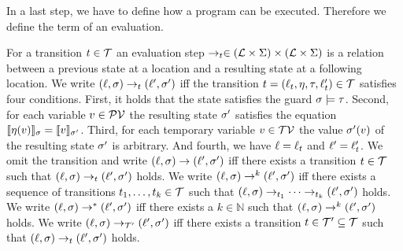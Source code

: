 In a last step, we have to define how a program can be executed.
Therefore we define the term of an evaluation.

\begin{definition}[Evaluation] 
  For a transition $t \in \mathcal{T}$ an evaluation step $\rightarrow_t \in (\mathcal{L} \times \Sigma) \times (\mathcal{L} \times \Sigma)$ is a relation between a previous state at a location and a resulting state at a following location.
  We write $(\ell, \sigma) \rightarrow_t (\ell', \sigma')$ iff the transition $t = (\ell_t, \eta, \tau, \ell_t') \in \mathcal{T}$ satisfies four conditions.
  First, it holds that the state satisfies the guard $\sigma \models \tau$.
  Second, for each variable $v \in \mathcal{PV}$ the resulting state $\sigma'$ satisfies the equation $\llbracket \eta(v) \rrbracket_{\sigma} = \llbracket v \rrbracket_{\sigma'}$.
  Third, for each temporary variable $v \in \mathcal{TV}$ the value $\sigma'(v)$ of the resulting state $\sigma'$ is arbitrary.
  And fourth, we have $\ell = \ell_t$ and $\ell' = \ell_t'$.
  We omit the transition and write $(\ell, \sigma) \rightarrow (\ell', \sigma')$ iff there exists a transition $t \in \mathcal{T}$ such that $(\ell, \sigma) \rightarrow_t (\ell', \sigma')$ holds.
  We write $(\ell, \sigma) \rightarrow^k (\ell', \sigma')$ iff there exists a sequence of transitions $t_1, \dots, t_k \in \mathcal{T}$ such that $(\ell, \sigma) \rightarrow_{t_1} \dots \rightarrow_{t_k} (\ell', \sigma')$ holds.
  We write $(\ell, \sigma) \rightarrow^* (\ell', \sigma')$ iff there exists a $k \in \mathbb{N}$ such that $(\ell, \sigma) \rightarrow^k (\ell', \sigma')$ holds.
  We write $(\ell, \sigma) \rightarrow_{\mathcal{T}'} (\ell', \sigma')$ iff there exists a transition $t \in \mathcal{T}' \subseteq \mathcal{T}$ such that $(\ell, \sigma) \rightarrow_t (\ell', \sigma')$ holds.
\end{definition}
